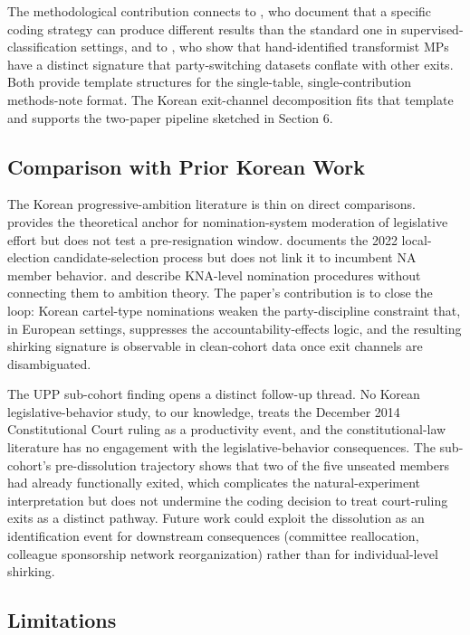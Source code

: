 \documentclass[11pt]{article}
\begin{document}
The methodological contribution connects to \citet{laurer2023}, who document that a specific coding strategy can produce different results than the standard one in supervised-classification settings, and to \citet{giommoni2022}, who show that hand-identified transformist MPs have a distinct signature that party-switching datasets conflate with other exits. Both provide template structures for the single-table, single-contribution methods-note format. The Korean exit-channel decomposition fits that template and supports the two-paper pipeline sketched in Section 6.

\subsection{Comparison with Prior Korean Work}

The Korean progressive-ambition literature is thin on direct comparisons. \citet{kim2020} provides the theoretical anchor for nomination-system moderation of legislative effort but does not test a pre-resignation window. \citet{yoon2022} documents the 2022 local-election candidate-selection process but does not link it to incumbent NA member behavior. \citet{jung2021} and \citet{lee2020} describe KNA-level nomination procedures without connecting them to ambition theory. The paper's contribution is to close the loop: Korean cartel-type nominations weaken the party-discipline constraint that, in European settings, suppresses the accountability-effects logic, and the resulting shirking signature is observable in clean-cohort data once exit channels are disambiguated.

The UPP sub-cohort finding opens a distinct follow-up thread. No Korean legislative-behavior study, to our knowledge, treats the December 2014 Constitutional Court ruling as a productivity event, and the constitutional-law literature \citep{kim2017, kwon2015} has no engagement with the legislative-behavior consequences. The sub-cohort's pre-dissolution trajectory shows that two of the five unseated members had already functionally exited, which complicates the natural-experiment interpretation but does not undermine the coding decision to treat court-ruling exits as a distinct pathway. Future work could exploit the dissolution as an identification event for downstream consequences (committee reallocation, colleague sponsorship network reorganization) rather than for individual-level shirking.

\subsection{Limitations}
\end{document}
